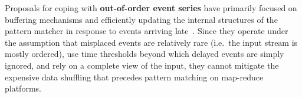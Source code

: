 Proposals for coping with {\bf out-of-order event series} have 
primarily focused on buffering mechanisms and
 efficiently updating the internal structures of the pattern matcher in 
 response to events arriving late~\cite{Johnson:2007,Li:2007,Chandramouli:2010}.
Since they operate under the assumption that misplaced events are relatively 
rare (i.e.\ the input stream is mostly ordered),
use time thresholds beyond which delayed events are simply ignored,
and rely on a complete view of the input, they cannot mitigate the expensive 
data shuffling that precedes pattern matching on map-reduce platforms.   
 





